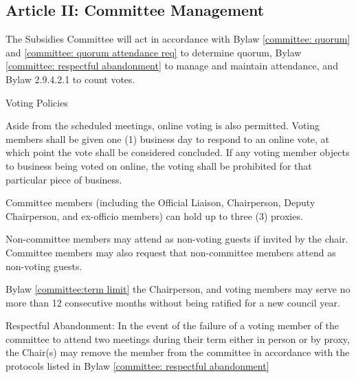 \subsection{Article II: Committee Management}
\begin{longenum}[ label*=\thesubsection.\arabic*., align=left] 
	\item The Subsidies Committee will act in accordance with Bylaw \ref{committee: quorum} and \ref{committee: quorum attendance req} to determine quorum, Bylaw \ref{committee: respectful abandonment} to manage and maintain attendance, and Bylaw 2.9.4.2.1 to count votes.
	\item Voting Policies
		\begin{longenum}[ label*=\arabic*., align=left] 
		\item Aside from the scheduled meetings, online voting is also permitted. Voting members shall be given one (1) business day to respond to an online vote, at which point the vote shall be considered concluded. If any voting member objects to business being voted on online, the voting shall be prohibited for that particular piece of business.
		\item Committee members (including the Official Liaison, Chairperson, Deputy Chairperson, and ex-officio members) can hold up to three (3) proxies.
		\end{longenum}
	\item Non-committee members may attend as non-voting guests if invited by the chair. Committee members may also request that non-committee members attend as non-voting guests.
	\item Bylaw \ref{committee:term limit} the Chairperson, and voting members may serve no more than 12 consecutive months without being ratified for a new council year.
	\item Respectful Abandonment: In the event of the failure of a voting member of the committee to attend two meetings during their term either in person or by proxy, the Chair(s) may remove the member from the committee in accordance with the protocols listed in Bylaw \ref{committee: respectful abandonment}
\end{longenum}

